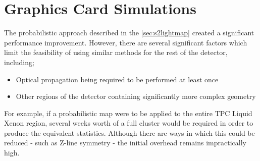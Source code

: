 \section{Graphics Card Simulations}

\par
The probabilistic approach described in the \autoref{sec:s2lightmap} created a significant performance improvement. 
However, there are several significant factors which limit the feasibility of using similar methods for the rest of the detector, including;
\begin{itemize}
    \item Optical propagation being required to be performed at least once
    \item Other regions of the detector containing significantly more complex geometry
\end{itemize}
For example, if a probabilistic map were to be applied to the entire TPC Liquid Xenon region, several weeks worth of a full cluster would be required in order to produce the equivalent statistics.
Although there are ways in which this could be reduced - such as Z-line symmetry - the initial overhead remains impractically high.

